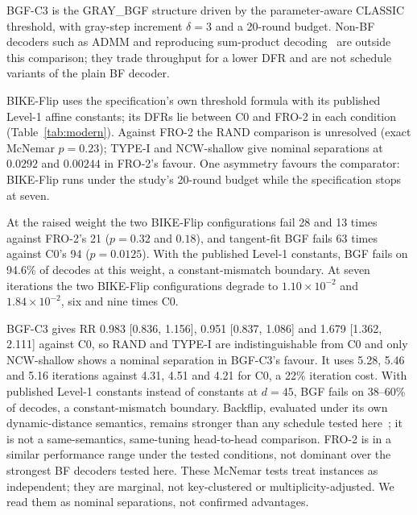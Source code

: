 \documentclass[letterpaper,journal]{IEEEtran}
\begin{document}
BGF-C3 is the GRAY\_BGF structure driven by the parameter-aware CLASSIC threshold, with gray-step increment $\delta=3$ and a 20-round budget. Non-BF decoders such as ADMM and reproducing sum-product decoding~\cite{watanabe2024admm} are outside this comparison; they trade throughput for a lower DFR and are not schedule variants of the plain BF decoder.

BIKE-Flip uses the specification's own threshold formula with its published Level-1 affine constants; its DFRs lie between C0 and FRO-2 in each condition (Table~\ref{tab:modern}). Against FRO-2 the RAND comparison is unresolved (exact McNemar $p=0.23$); TYPE-I and NCW-shallow give nominal separations at $0.0292$ and $0.00244$ in FRO-2's favour. One asymmetry favours the comparator: BIKE-Flip runs under the study's 20-round budget while the specification stops at seven.

At the raised weight the two BIKE-Flip configurations fail 28 and 13 times against FRO-2's 21 ($p=0.32$ and $0.18$), and tangent-fit BGF fails 63 times against C0's 94 ($p=0.0125$). With the published Level-1 constants, BGF fails on 94.6\% of decodes at this weight, a constant-mismatch boundary. At seven iterations the two BIKE-Flip configurations degrade to $1.10\times10^{-2}$ and $1.84\times10^{-2}$, six and nine times C0.

BGF-C3 gives RR 0.983 [0.836, 1.156], 0.951 [0.837, 1.086] and 1.679 [1.362, 2.111] against C0, so RAND and TYPE-I are indistinguishable from C0 and only NCW-shallow shows a nominal separation in BGF-C3's favour. It uses 5.28, 5.46 and 5.16 iterations against 4.31, 4.51 and 4.21 for C0, a 22\% iteration cost. With published Level-1 constants instead of constants at $d=45$, BGF fails on 38--60\% of decodes, a constant-mismatch boundary. Backflip, evaluated under its own dynamic-distance semantics, remains stronger than any schedule tested here~\cite{sendrier2020lowdfr,vasseur2021thesis}; it is not a same-semantics, same-tuning head-to-head comparison. FRO-2 is in a similar performance range under the tested conditions, not dominant over the strongest BF decoders tested here. These McNemar tests treat instances as independent; they are marginal, not key-clustered or multiplicity-adjusted. We read them as nominal separations, not confirmed advantages.
\end{document}
